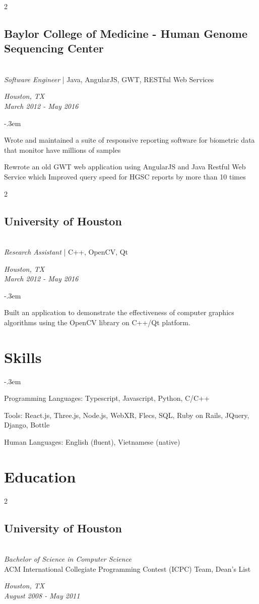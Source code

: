 \documentclass{article}
\let\olditemize=\itemize \let\endolditemize=\enditemize
\renewenvironment{itemize}{\olditemize[topsep=0em] \itemsep-.3em}{\endolditemize}
\newenvironment{twocolentry}[2][]{
    \def\secondColumn{#2}
    \raggedright
    \setcolumnwidth{\fill, 6cm}
    \begin{paracol}{2}
}{
    \switchcolumn \raggedleft \secondColumn
    \end{paracol}
} %
\begin{document}
\newpage
\begin{twocolentry}{
  \textit{Houston, TX} \\
  \textit{March 2012 - May 2016} \\
}
\subsection{Baylor College of Medicine - Human Genome Sequencing Center}\hfill\\
\textit{Software Engineer} | Java, AngularJS, GWT, RESTful Web Services
\end{twocolentry}
\begin{itemize}
  \item Wrote and maintained a suite of responsive reporting software for biometric data that
  monitor have millions of samples
  \item Rewrote an old GWT web application using AngularJS and Java Restful Web Service which
  Improved query speed for HGSC reports by more than 10 times
\end{itemize}

\begin{twocolentry}{
  \textit{Houston, TX} \\
  \textit{March 2012 - May 2016} \\
}
\subsection{University of Houston}\hfill\\
\textit{Research Assistant} | C++, OpenCV, Qt
\end{twocolentry}
\begin{itemize}
  \item Built an application to demonstrate the effectiveness of computer graphics algorithms using
  the OpenCV library on C++/Qt platform.
\end{itemize}


\section{Skills}
\begin{itemize}
\item Programming Languages: Typescript, Javascript, Python, C/C++
\item Tools: React.js, Three.js, Node.js, WebXR, Flecs, SQL, Ruby on Rails, JQuery, Django, Bottle
\item Human Languages: English (fluent), Vietnamese (native)
\end{itemize}

\section{Education}
\begin{twocolentry}{
  \textit{Houston, TX} \\
  \textit{August 2008 - May 2011} \\
}
\subsection{University of Houston}\hfill\\
\textit{Bachelor of Science in Computer Science}\\
ACM International Collegiate Programming Contest (ICPC) Team, Dean's List
\end{twocolentry}
\end{document}
